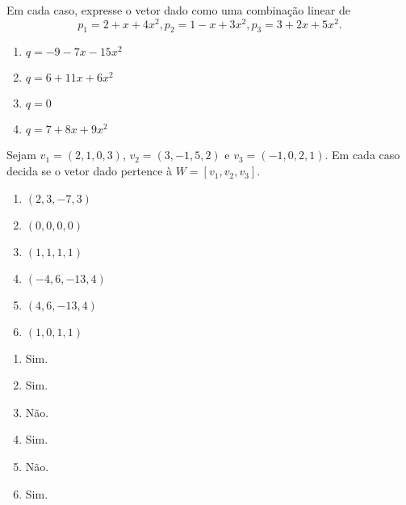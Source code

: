 \documentclass[12pt]{exam}
\begin{document}
\begin{exercicio}
    Em cada caso, expresse o vetor dado como uma combinação linear de
    \[
        p_1 = 2 + x + 4x^2,
        p_2 = 1 - x + 3x^2,
        p_3 = 3 + 2x + 5x^2.
    \]
    \begin{multicols}{2}
        \begin{enumerate}[label={\alph*})]
            \item $q = -9 -7x - 15x^2$

            \item $q = 6 + 11x + 6x^2$

            \item $q = 0$

            \item $q = 7 + 8x + 9x^2$
        \end{enumerate}
    \end{multicols}
\end{exercicio}

\begin{exercicio}
    Sejam $v_1 = (2, 1, 0, 3)$, $v_2 = (3, -1, 5, 2)$ e $v_3 = (-1, 0, 2, 1)$. Em cada caso decida se o vetor dado pertence à $W = [v_1, v_2, v_3]$.
    \begin{multicols}{2}
        \begin{enumerate}[label={\alph*})]
            \item $(2, 3, -7, 3)$

            \item $(0, 0, 0, 0)$

            \item $(1, 1, 1, 1)$

            \item $(-4, 6, -13, 4)$

            \item $(4, 6, -13, 4)$

            \item $(1, 0, 1, 1)$
        \end{enumerate}
    \end{multicols}
    \begin{solucao}
      \begin{multicols}{2}
        \begin{enumerate}
          \item Sim.

          \item Sim.

          \item Não.

          \item Sim.

          \item Não.

          \item Sim.
        \end{enumerate}
      \end{multicols}
    \end{solucao}
\end{exercicio}
\end{document}
